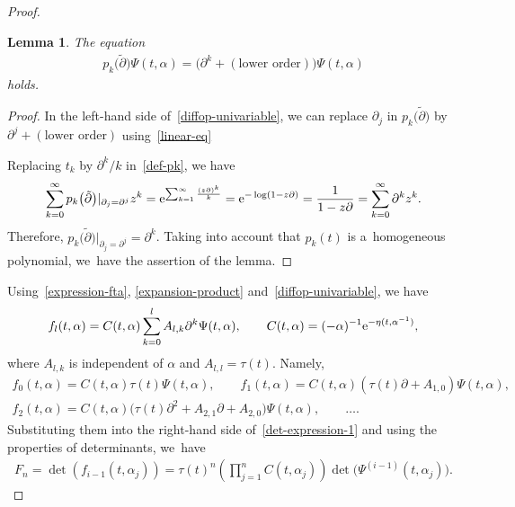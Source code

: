 \documentclass[pdftex]{sigma}
\numberwithin{equation}{section}
\newtheorem{Lemma}[Theorem]{Lemma}
\theoremstyle{definition}
\begin{document}
\begin{proof}
\begin{Lemma}
The equation
\begin{gather}
p_k\bigl(\tilde{\partial}\bigr)\Psi(t,\alpha)=
\bigl( \partial^k+(\text{lower order}) \bigr) \Psi(t,\alpha)
\label{diffop-univariable}
\end{gather}
holds.
\end{Lemma}

\begin{proof}
In the left-hand side of~\eqref{diffop-univariable},
 we can replace $\partial_j$ in $p_k\bigl(\tilde{\partial}\bigr)$ by
$\partial^j+(\text{lower order})$ using~\eqref{linear-eq}

Replacing $t_k$ by $\partial^k/k$ in~\eqref{def-pk}, we have
\begin{gather*}
\sum_{k=0}^\infty p_k\bigl(\tilde{\partial}\bigr)|_{\partial_j=\partial^j}z^k
=
{\rm e}^{\sum_{k=1}^\infty \frac{(z\partial)^k}{k}}
=
{\rm e}^{-\log(1-z\partial)}
=
\frac{1}{1-z\partial}
=
\sum_{k=0}^\infty \partial^k z^k.
\end{gather*}
Therefore, $
p_k\bigl(\tilde{\partial}\bigr)|_{\partial_j=\partial^j}=\partial^k$.
Taking into account that $p_k(t)$ is a~homogeneous polynomial, we~have the assertion
of the lemma.
\end{proof}

Using~\eqref{expression-fta}, \eqref{expansion-product} and~\eqref{diffop-univariable}, we have
\begin{gather}
f_l(t,\alpha)
=
C(t,\alpha)
\sum_{k=0}^lA_{l,k}\partial^k\Psi(t,\alpha),
\qquad
C(t,\alpha)=(-\alpha)^{-1} {\rm e}^{-\eta(t,\alpha^{-1})},
\label{fl}
\end{gather}
where $A_{l,k}$ is independent of $\alpha$ and $A_{l,l}=\tau(t)$. Namely,
\begin{gather*}
f_0(t,\alpha)=C(t,\alpha)\tau(t)\Psi(t,\alpha),
\qquad
f_1(t,\alpha)=C(t,\alpha)(\tau(t)\partial+A_{1,0})\Psi(t,\alpha),
\\
f_2(t,\alpha)=C(t,\alpha)\big(\tau(t)\partial^2+A_{2,1}\partial+A_{2,0}\big)\Psi(t,\alpha),
\qquad
\dots.
\end{gather*}
Substituting them into the right-hand side of~\eqref{det-expression-1} and using
the properties of determinants, we~have
\begin{gather}
F_n=\det(f_{i-1}(t,\alpha_j))=\tau(t)^n
\left(\prod_{j=1}^nC(t,\alpha_j)\right)
\det\bigl(\Psi^{(i-1)}(t,\alpha_j)\bigr).
\label{expression-Fn}
\end{gather}


\end{proof}
\end{document}
